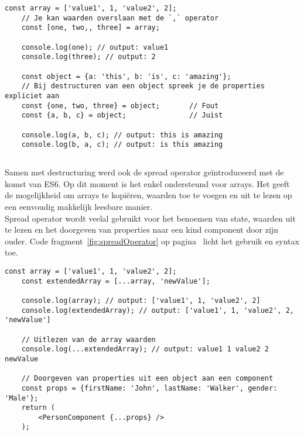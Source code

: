 \begin{lstlisting}[caption=Destructuring van een array en object, label={fig:destructuring}]
    const array = ['value1', 1, 'value2', 2];
    // Je kan waarden overslaan met de `,` operator
    const [one, two,, three] = array;
    
    console.log(one); // output: value1
    console.log(three); // output: 2
    
    const object = {a: 'this', b: 'is', c: 'amazing'};
    // Bij destructuren van een object spreek je de properties expliciet aan
    const {one, two, three} = object;       // Fout
    const {a, b, c} = object;               // Juist
    
    console.log(a, b, c); // output: this is amazing
    console.log(b, a, c); // output: is this amazing
\end{lstlisting}

\subsection{}
\label{sec:spreadOperator}

Samen met destructuring werd ook de spread operator geïntroduceerd met de komst van ES6. Op dit moment is het enkel ondersteund voor arrays. Het geeft de mogelijkheid om arrays te kopiëren, waarden toe te voegen en uit te lezen op een eenvoudig makkelijk leesbare manier.\\
Spread operator wordt veelal gebruikt voor het benoemen van state, waarden uit te lezen en het doorgeven van properties naar een kind component door zijn ouder. Code fragment~\ref{fig:spreadOperator} op pagina~\pageref{fig:spreadOperator} licht het gebruik en syntax toe.\\

\begin{lstlisting}[caption=Gebruik van de spread operator, label={fig:spreadOperator}]
    const array = ['value1', 1, 'value2', 2];
    const extendedArray = [...array, 'newValue'];
    
    console.log(array); // output: ['value1', 1, 'value2', 2]
    console.log(extendedArray); // output: ['value1', 1, 'value2', 2, 'newValue']
    
    // Uitlezen van de array waarden
    console.log(...extendedArray); // output: value1 1 value2 2 newValue
    
    // Doorgeven van properties uit een object aan een component
    const props = {firstName: 'John', lastName: 'Walker', gender: 'Male'};
    return (
        <PersonComponent {...props} />
    );
\end{lstlisting}

